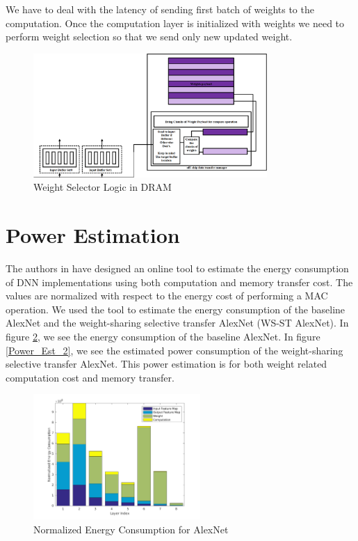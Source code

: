 \documentclass[conference]{IEEEtran}
\begin{document}
We have to deal with the latency of sending first batch of weights to the computation. Once the computation layer is initialized with weights we need to perform weight selection so that we send only new updated weight.

\begin{figure}[!ht]
\centering
\includegraphics[width=3.5in]{WS}
\caption{Weight Selector Logic in DRAM}
\label{WS}
\end{figure}




%
%
%
%
%






% 

\section{Power Estimation}
The authors in \cite{energy_est_mit} have designed an online tool to estimate the energy consumption of DNN implementations using both computation and memory transfer cost. The values are normalized with respect to the energy cost of performing a MAC operation. We used the tool to estimate the energy consumption of the baseline AlexNet and the weight-sharing selective transfer AlexNet (WS-ST AlexNet). In figure \ref{Power_Est_1}, we see the energy consumption of the baseline AlexNet. In figure \ref{Power_Est_2}, we see the estimated power consumption of the weight-sharing selective transfer AlexNet. This power estimation is for both weight related computation cost and memory transfer. 

 

\begin{figure}[!ht]
\centering
\includegraphics[width=2.5in]{EnergyVisualization_AlexNet}
\caption{Normalized Energy Consumption for AlexNet}
\label{Power_Est_1}
\end{figure}
\end{document}
